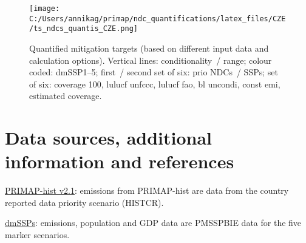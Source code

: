 \documentclass[12pt]{article}
\begin{document}
 \begin{figure}[H]
 \centering
 \texttt{[image: C:/Users/annikag/primap/ndc\_quantifications/latex\_files/CZE/ts\_ndcs\_quantis\_CZE.png]}
 \caption{Quantified mitigation targets (based on different input data and calculation options).
 Vertical lines: conditionality~/ range;
 colour coded: dmSSP1--5;
 first~/ second set of six: prio NDCs~/ SSPs;
 set of six: coverage 100, lulucf unfccc, lulucf fao, bl uncondi, const emi, estimated coverage.}
 \label{fig:miti}
 \end{figure}

 \newpage %
 \section{Data sources, additional information and references}
 \label{sec:dataSourcesRefs}

 \noindent \href{https://dataservices.gfz-potsdam.de/pik/showshort.php?id=escidoc:4736895}{PRIMAP-hist v2.1}: emissions from PRIMAP-hist are data from the country reported data priority scenario (HISTCR).

 \noindent \href{https://zenodo.org/record/3638137#.X2syXouxU2w}{dmSSPs}: emissions, population and GDP data are PMSSPBIE data for the five marker scenarios.
\end{document}
